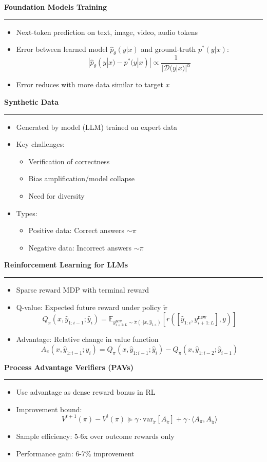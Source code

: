 \documentclass[8pt,letter,landscape]{article}
\newcommand{\sectiontitle}[1]{\textbf{\large #1}\vspace{0.2em}\hrule\vspace{0.5em}}
\begin{document}
\begin{multicols*}{3}
\sectiontitle{Foundation Models Training}
\begin{itemize}[leftmargin=*,nosep]
    \item Next-token prediction on text, image, video, audio tokens
    \item Error between learned model $\hat{p}_\theta(y|x)$ and ground-truth $p^*(y|x)$:
    $$|\hat{p}_\theta(y|x) - p^*(y|x)| \propto \frac{1}{|\mathcal{D}(y|x)|^\alpha}$$
    \item Error reduces with more data similar to target $x$
\end{itemize}

\sectiontitle{Synthetic Data}
\begin{itemize}[leftmargin=*,nosep]
    \item Generated by model (LLM) trained on expert data 
    \item Key challenges:
    \begin{itemize}[leftmargin=*,nosep]
        \item Verification of correctness
        \item Bias amplification/model collapse
        \item Need for diversity
    \end{itemize}
    \item Types:
    \begin{itemize}[leftmargin=*,nosep]
        \item Positive data: Correct answers $\sim \pi$
        \item Negative data: Incorrect answers $\sim \pi$
    \end{itemize}
\end{itemize}

\sectiontitle{Reinforcement Learning for LLMs}
\begin{itemize}[leftmargin=*,nosep]
    \item Sparse reward MDP with terminal reward
    \item Q-value: Expected future reward under policy $\tilde{\pi}$
    $$Q_\pi(x, \hat{y}_{1:i-1}; \hat{y}_i) = \mathbb{E}_{y^{\text{new}}_{i+1:L}\sim\tilde{\pi}(\cdot|x,\hat{y}_{1:i})}[r([\hat{y}_{1:i}, y^{\text{new}}_{i+1:L}], y)]$$
    \item Advantage: Relative change in value function
    $$A_\pi(x, \hat{y}_{1:i-1};\hat{y}_i) = Q_\pi(x, \hat{y}_{1:i-1};\hat{y}_i) - Q_\pi(x, \hat{y}_{1:i-2};\hat{y}_{i-1})$$
\end{itemize}

\sectiontitle{Process Advantage Verifiers (PAVs)}
\begin{itemize}[leftmargin=*,nosep]
    \item Use advantage as dense reward bonus in RL
    \item Improvement bound:
    $$V^{t+1}(\pi) - V^t(\pi) \succcurlyeq \gamma \cdot \text{var}_{\tilde{\pi}}[A_{\tilde{\pi}}] + \gamma \cdot \langle A_\pi, A_{\tilde{\pi}}\rangle$$
    \item Sample efficiency: 5-6x over outcome rewards only
    \item Performance gain: 6-7\% improvement
\end{itemize}

\end{multicols*}
\end{document}
